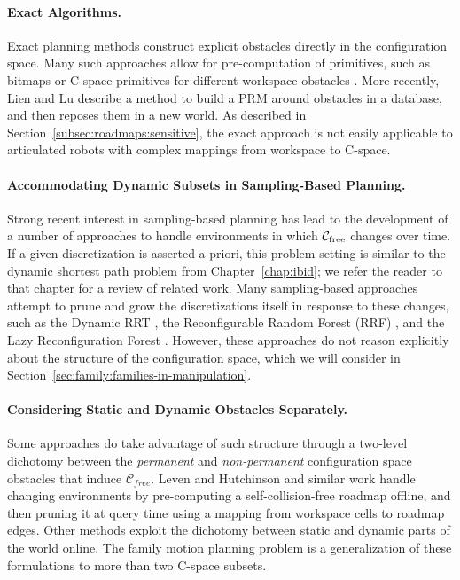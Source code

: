 \paragraph{Exact Algorithms.}
Exact planning methods construct explicit obstacles
directly in the configuration space.
Many such approaches allow for pre-computation of primitives,
such as bitmaps \citep{kavraki1995cspacefft}
or C-space primitives for different workspace obstacles
\citep{newmanbranicky1991cspacetransforms}.
More recently,
Lien and Lu \citep{lien2009similarobstacles} describe a method to
build a PRM around obstacles in a database,
and then reposes them in a new world.
As described in Section~\ref{subsec:roadmaps:sensitive},
the exact approach is not easily applicable to articulated robots
with complex mappings from workspace to C-space.

\paragraph{Accommodating Dynamic Subsets in Sampling-Based Planning.}
Strong recent interest in sampling-based planning
has lead to the development of a number of approaches to handle
environments in which $\mathcal{C}_{\mbox{\scriptsize free}}$ changes over time.
If a given discretization is asserted a priori,
this problem setting is similar to the dynamic shortest path problem
from Chapter~\ref{chap:ibid};
we refer the reader to that chapter for a review of related work.
Many sampling-based approaches attempt to prune and grow
the discretizations itself in response to these changes,
such as the Dynamic RRT \citep{ferguson2006drrt},
the Reconfigurable Random Forest (RRF)
\citep{li2002incrementalprmmanagement},
and the Lazy Reconfiguration Forest
\citep{gayle2007lazyreconfigforest}.
However, these approaches do not reason explicitly about the
structure of the configuration space,
which we will consider
in Section~\ref{sec:family:families-in-manipulation}.

\paragraph{Considering Static and Dynamic Obstacles Separately.}
Some approaches do take advantage of such structure
through a two-level dichotomy between
the \emph{permanent} and \emph{non-permanent} configuration space
obstacles that induce $\mathcal{C}_{free}$.
Leven and Hutchinson \citep{leven2000changing, leven2002changing}
and similar work \citep{kallman2004dynamicroadmaps}
handle changing environments by
pre-computing a self-collision-free roadmap offline,
and then pruning it at query time
using a mapping from workspace cells to roadmap edges.
Other methods \citep{jaillet2004dynamicprm}
exploit the dichotomy between static and dynamic parts of
the world online.
The family motion planning problem is a generalization of these
formulations to more than two C-space subsets.

